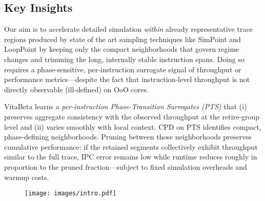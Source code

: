 \documentclass[conference]{IEEEtran}
\begin{document}
\subsection{Key Insights}
\label{sec:intuition}
Our aim is to accelerate detailed simulation \emph{within} already representative trace regions produced by state of the art sampling techniques like SimPoint and LoopPoint by keeping only the compact neighborhoods that govern regime changes and trimming the long, internally stable instruction spans. Doing so requires a phase-sensitive, per-instruction surrogate signal of throughput or performance metrics—despite the fact that instruction-level throughput is not directly observable (ill-defined) on OoO cores.

VitaBeta learns a \emph{per-instruction Phase-Transition Surrogates (PTS)} that (i) preserves aggregate consistency with the observed throughput at the retire-group level and (ii) varies smoothly with local context. CPD on PTS identifies compact, phase-defining neighborhoods. Pruning between those neighborhoods preserves cumulative performance: if the retained segments collectively exhibit throughput similar to the full trace, IPC error remains low while runtime reduces roughly in proportion to the pruned fraction—subject to fixed simulation overheads and warmup costs.

\begin{figure}[!htbp]
    \centering
    \setlength{\belowcaptionskip}{-10pt}
    \captionsetup{skip=0pt}
    \captionsetup[subfigure]{font=footnotesize, skip=1pt}
    \texttt{[image: images/intro.pdf]}
    
    
    \label{fig:benchmarks}
\end{figure}
\end{document}
